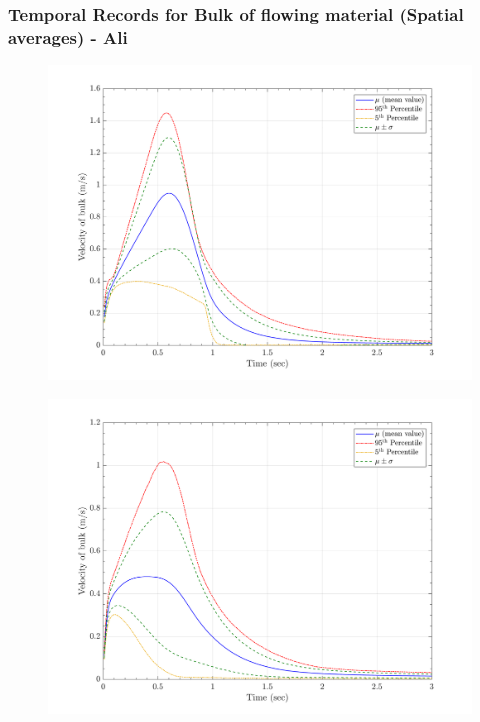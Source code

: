 \documentclass{article}
\begin{document}
\subsubsection{Temporal Records for Bulk of flowing material (Spatial averages) - Ali}

\begin{figure}[H]
        \begin{minipage}[b]{0.5\linewidth}
                \centering
                \includegraphics[width=1\textwidth]{InclinedPlane/GlobalRecords/C_Global_Vel.png}
                \label{fig:Ramp-SP-Vel-C}
        \end{minipage}
        \begin{minipage}[b]{0.5\linewidth}
                \centering
                \includegraphics[width=1\textwidth]{InclinedPlane/GlobalRecords/P_Global_Vel.png}
                \label{fig:Ramp-SP-Vel-P}
        \end{minipage}


\end{figure}
\end{document}
